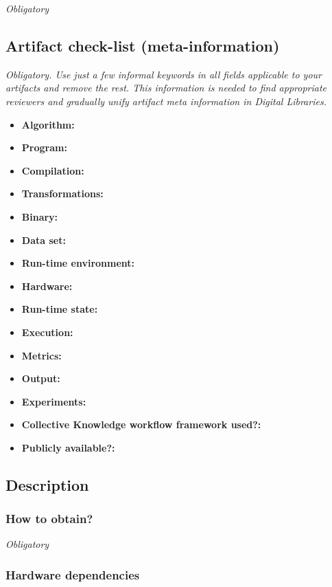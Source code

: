 \documentclass{sigplanconf}
\begin{document}
{\em Obligatory}

\subsection{Artifact check-list (meta-information)}

{\em Obligatory. Use just a few informal keywords in all fields applicable to your artifacts
and remove the rest. This information is needed to find appropriate reviewers and gradually 
unify artifact meta information in Digital Libraries.}

{\small
\begin{itemize}
  \item {\bf Algorithm: }
  \item {\bf Program: }
  \item {\bf Compilation: }
  \item {\bf Transformations: }
  \item {\bf Binary: }
  \item {\bf Data set: }
  \item {\bf Run-time environment: }
  \item {\bf Hardware: }
  \item {\bf Run-time state: }
  \item {\bf Execution: }
  \item {\bf Metrics: }
  \item {\bf Output: }
  \item {\bf Experiments: }
  \item {\bf Collective Knowledge workflow framework used?: } 
  \item {\bf Publicly available?: }
\end{itemize}

\subsection{Description}

\subsubsection{How to obtain?}

{\em Obligatory}

\subsubsection{Hardware dependencies}

}
\end{document}
